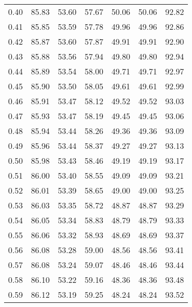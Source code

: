 \begin{tabular}{|c|c|c|c|c|c|c|}
      0.40 &     85.83 &     53.60 &      57.67 &   50.06 &      50.06 &         92.82 \\
      0.41 &     85.85 &     53.59 &      57.78 &   49.96 &      49.96 &         92.86 \\
      0.42 &     85.87 &     53.60 &      57.87 &   49.91 &      49.91 &         92.90 \\
      0.43 &     85.88 &     53.56 &      57.94 &   49.80 &      49.80 &         92.94 \\
      0.44 &     85.89 &     53.54 &      58.00 &   49.71 &      49.71 &         92.97 \\
      0.45 &     85.90 &     53.50 &      58.05 &   49.61 &      49.61 &         92.99 \\
      0.46 &     85.91 &     53.47 &      58.12 &   49.52 &      49.52 &         93.03 \\
      0.47 &     85.93 &     53.47 &      58.19 &   49.45 &      49.45 &         93.06 \\
      0.48 &     85.94 &     53.44 &      58.26 &   49.36 &      49.36 &         93.09 \\
      0.49 &     85.96 &     53.44 &      58.37 &   49.27 &      49.27 &         93.13 \\
      0.50 &     85.98 &     53.43 &      58.46 &   49.19 &      49.19 &         93.17 \\
      0.51 &     86.00 &     53.40 &      58.55 &   49.09 &      49.09 &         93.21 \\
      0.52 &     86.01 &     53.39 &      58.65 &   49.00 &      49.00 &         93.25 \\
      0.53 &     86.03 &     53.35 &      58.72 &   48.87 &      48.87 &         93.29 \\
      0.54 &     86.05 &     53.34 &      58.83 &   48.79 &      48.79 &         93.33 \\
      0.55 &     86.06 &     53.32 &      58.93 &   48.69 &      48.69 &         93.37 \\
      0.56 &     86.08 &     53.28 &      59.00 &   48.56 &      48.56 &         93.41 \\
      0.57 &     86.08 &     53.24 &      59.07 &   48.46 &      48.46 &         93.44 \\
      0.58 &     86.10 &     53.22 &      59.16 &   48.36 &      48.36 &         93.48 \\
      0.59 &     86.12 &     53.19 &      59.25 &   48.24 &      48.24 &         93.52 \\

\end{tabular}
